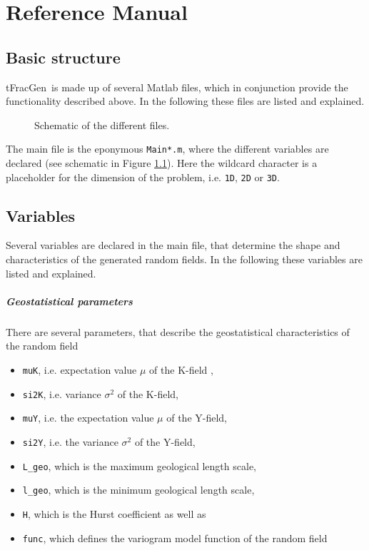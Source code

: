 \documentclass[12pt]{report}
\def\QI{{\sc tFracGen}}
\begin{document}
\chapter{Reference Manual}


\section{Basic structure}

\QI\ is made up of several Matlab files, which in conjunction provide the functionality described above. In the following these files are listed and explained.

\begin{figure}[ht]
	\centering
	
	\caption{Schematic of the different files.}
	\label{fig:Overview}
\end{figure}

The main file is the eponymous {\tt Main*.m}, where the different variables are declared (see schematic in Figure \ref{fig:Overview}). Here the wildcard character is a placeholder for the dimension of the problem, i.e. {\tt 1D}, {\tt 2D} or {\tt 3D}. %

\section{Variables}

Several variables are declared in the main file, that determine the shape and characteristics of the generated random fields. In the following these variables are listed and explained.

\paragraph{Geostatistical parameters}

There are several parameters, that describe the geostatistical characteristics of the random field

\begin{itemize}
	\item {\tt muK}, i.e. expectation value $\mu$ of the K-field ,
	\item {\tt si2K}, i.e. variance $\sigma^2$ of the K-field,
	\item {\tt muY}, i.e. the expectation value $\mu$ of the Y-field,
	\item {\tt si2Y}, i.e. the variance $\sigma^2$ of the Y-field,
	\item {\tt L\_geo}, which is the maximum geological length scale, 
	\item {\tt l\_geo}, which is the minimum geological length scale,
	\item {\tt H}, which is the Hurst coefficient as well as 
	\item {\tt func}, which defines the variogram model function of the random field
\end{itemize}
\end{document}
